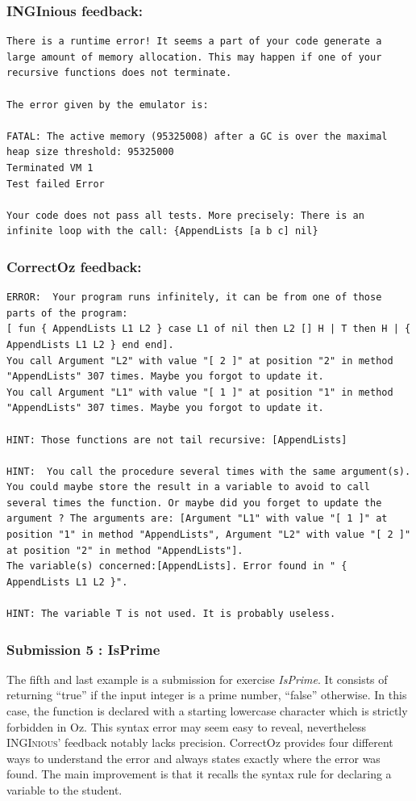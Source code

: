 \documentclass[11pt,a4paper,twoside,openright]{report}
\begin{document}
\subsubsection*{INGInious feedback:}
 \begin{lstlisting}
There is a runtime error! It seems a part of your code generate a large amount of memory allocation. This may happen if one of your recursive functions does not terminate.

The error given by the emulator is:

FATAL: The active memory (95325008) after a GC is over the maximal heap size threshold: 95325000 
Terminated VM 1
Test failed Error

Your code does not pass all tests. More precisely: There is an infinite loop with the call: {AppendLists [a b c] nil}
 \end{lstlisting}
 
\subsubsection*{CorrectOz feedback:}
 \begin{lstlisting}
ERROR:  Your program runs infinitely, it can be from one of those parts of the program: 
[ fun { AppendLists L1 L2 } case L1 of nil then L2 [] H | T then H | { AppendLists L1 L2 } end end].
You call Argument "L2" with value "[ 2 ]" at position "2" in method "AppendLists" 307 times. Maybe you forgot to update it.
You call Argument "L1" with value "[ 1 ]" at position "1" in method "AppendLists" 307 times. Maybe you forgot to update it.

HINT: Those functions are not tail recursive: [AppendLists]

HINT:  You call the procedure several times with the same argument(s). You could maybe store the result in a variable to avoid to call several times the function. Or maybe did you forget to update the argument ? The arguments are: [Argument "L1" with value "[ 1 ]" at position "1" in method "AppendLists", Argument "L2" with value "[ 2 ]" at position "2" in method "AppendLists"].
The variable(s) concerned:[AppendLists]. Error found in " { AppendLists L1 L2 }".

HINT: The variable T is not used. It is probably useless.
 \end{lstlisting}
 
\subsubsection{Submission 5 : IsPrime}
The fifth and last example is a submission for exercise \textit{IsPrime}. It 
consists of returning \enquote{true} if the input integer is a prime number, 
\enquote{false} otherwise. In this case, the function is declared with a 
starting lowercase character which is strictly forbidden in Oz. This syntax error 
may seem easy to reveal, nevertheless \textsc{INGInious}' feedback notably lacks 
precision. CorrectOz provides four different ways to understand the 
error and always states exactly where the error was found. The main improvement 
is that it recalls the syntax rule for declaring a variable to the student.
\end{document}

